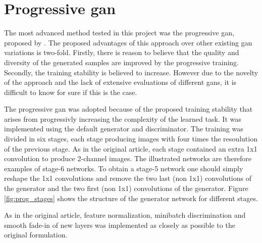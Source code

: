 \section{Progressive \acrshort{gan}}
The most advanced method tested in this project was the progressive \acrshort{gan}, proposed by \textcite{karras2017progressive}. The proposed advantages of this approach over other existing \acrshort{gan} variations is two-fold. Firstly, there is reason to believe that the quality and diversity of the generated samples are improved by the progressive training. Secondly, the training stability is believed to increase. However due to the novelty of the approach and the lack of extensive evaluations of different \acrshort{gans}, it is difficult to know for sure if this is the case.

The progressive \acrshort{gan} was adopted because of the proposed training stability that arises from progressivly increasing the complexity of the learned task. It was implemented using the default generator and discriminator. The training was divided in six stages, each stage producing images with four times the resoulution of the previous stage. As in the original article, each stage contained an extra 1x1 convolution to produce 2-channel images. The illustrated networks are therefore examples of stage-6 networks. To obtain a stage-5 network one should simply reshape the 1x1 convolutions and remove the two last (non 1x1) convolutions of the generator and the two first (non 1x1) convolutions of the generator. Figure \ref{fig:prog_stages} shows the structure of the generator network for different stages.

As in the original article, feature normalization, minibatch discrimination and smooth fade-in of new layers was implemented as closely as possible to the original formulation.



